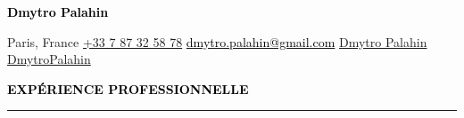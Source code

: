 \documentclass[10pt,english,french]{article}
\newcommand{\linkedinIcon}[1][black]{\textcolor{#1}{\faLinkedin}}
\newcommand{\githubIcon}[1][black]{\textcolor{#1}{\faGithub}}
\newcommand{\emailIcon}[1][black]{\textcolor{#1}{\faEnvelope}}
\newcommand{\emailLink}[2][black]{\href{mailto:#2}{\emailIcon[black] \textcolor{#1}{#2}}}
\newcommand{\locationIcon}[1][black]{\textcolor{#1}{\faMapMarker}}
\newcommand{\phoneIcon}[1][black]{\textcolor{#1}{\faPhone}}
\newcommand{\birthdayIcon}[1][black]{\textcolor{#1}{\faUser}}
\newcommand{\nationalityIcon}[1][black]{\textcolor{#1}{\faGlobe}}
\newcommand{\cvsection}[1]{
    \vspace{4pt}
    \textbf{\fontsize{9pt}{10pt}\selectfont \textcolor{black}{#1}}
    \vspace{6pt}
    \hrule
    \vspace{6pt}
}
\begin{document}
\sloppy             %
\hfuzz=10000pt      %

\noindent
\begin{minipage}[c]{0.86\textwidth}
    \begin{center}
        \textbf{\textcolor{black}{\fontsize{17pt}{12pt}\selectfont Dmytro Palahin}}
    \end{center}
    \vspace{-18pt}
    \begin{center}
        {\fontsize{9pt}{11pt}\selectfont
            \locationIcon[black]\hspace{3pt}Paris, France\hspace{18pt}
            \href{tel:+33787325878}{\phoneIcon[black]\hspace{3pt}+33 7 87 32 58 78}\hspace{18pt}
            \emailLink[black]{dmytro.palahin@gmail.com}\hspace{18pt}
            \linkedinIcon[black]\hspace{3pt}\href{https://www.linkedin.com/in/dmytro-palahin/}{Dmytro Palahin}\hspace{18pt}
            \githubIcon[black]\hspace{3pt}\href{https://github.com/DmytroPalahin}{DmytroPalahin}\hspace{18pt}
        }
    \end{center}
\end{minipage}%
\hspace{3pt}
\begin{minipage}[c]{0.11\textwidth}
    \vspace{-12pt}
    \raggedleft{}
\end{minipage}

\vspace{-10pt}
\cvsection{EXPÉRIENCE PROFESSIONNELLE}
\end{document}
